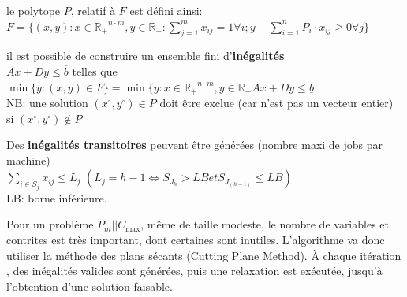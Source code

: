 \documentclass[a4paper,12pt]{report}
\theoremstyle{plain}				%
\theoremstyle{definition}				%
\newcommand\PmCmax{$P_m||C_{\max}$\xspace}
\begin{document}
\bigskip
le polytope $P$, relatif à $F$ est défini ainsi: \\
$F=\{ (x,y) : x \in \mathbb{R_+}^{n \cdot m}, y \in \mathbb{R_+} : \sum_{j=1}^{m} x_{ij}=1 \forall i;
y-\sum_{i=1}^{n} P_i \cdot x_{ij} \geq 0 \forall j	\}$

\bigskip
il est possible de construire un ensemble fini d'\textbf{inégalités} \\
$Ax+Dy \leq \overline{b}$ telles que \\
$\min \{y : (x,y) \in F \} = \min \{y : x \in \mathbb{R_+}^{n \cdot m}, y \in \mathbb{R_+} Ax+Dy \leq \underline{b}$ \\
NB: une solution $(x \ensuremath{^\circ} , y\ensuremath{^\circ}) \in P$ doit être exclue (car n'est pas un vecteur entier) si $(x\ensuremath{^\circ}, y\ensuremath{^\circ}) \notin P $

\bigskip
Des \textbf{inégalités transitoires} peuvent être générées (nombre maxi de jobs par machine) \\
$\sum_{i \in S_j} x_{ij} \leq L_j$ \quad $(L_j = h-1 \iff S_{J_h} > LB et S_{J_{(h-1)}} \leq LB)$\\
LB: borne inférieure.

\bigskip

Pour un problème \PmCmax, même de taille modeste, le nombre de
variables et contrites est très important, dont certaines sont
inutiles.
L'algorithme va donc utiliser la méthode des plans sécants (Cutting
Plane Method).
\`A chaque itération , des inégalités valides sont générées, puis une
relaxation est exécutée, jusqu'à l'obtention d'une solution faisable.
\end{document}
